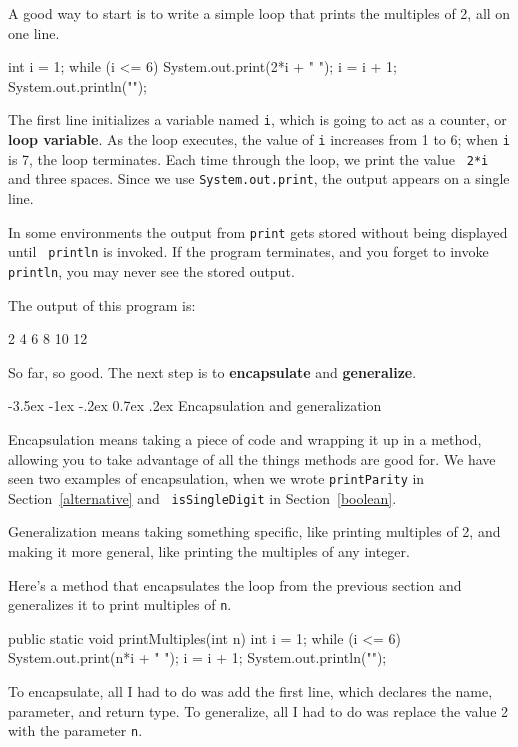 \documentclass{book}
\makeatletter
\renewcommand{\section}{\@startsection 
    {section} {1} {0mm}%
    {-3.5ex \@plus -1ex \@minus -.2ex}%
    {0.7ex \@plus.2ex}%
    {\normalfont\Large\bfseries}}
\makeatother
\begin{document}
A good way to start is to write a simple loop that prints
the multiples of 2, all on one line.

\begin{verbatimtab}
    int i = 1;
    while (i <= 6) {
      System.out.print(2*i + "   ");
      i = i + 1;
    }
    System.out.println("");
\end{verbatimtab}
%
The first line initializes a variable named {\tt i}, which is going
to act as a counter, or {\bf loop variable}.  As the loop executes,
the value of {\tt i} increases from 1 to 6; when {\tt i} is 7, the
loop terminates.  Each time through the loop, we print the value {\tt
  2*i} and three spaces.  Since we use {\tt System.out.print}, 
the output appears on a single line.


In some environments the
output from {\tt print} gets stored without being displayed until {\tt
println} is invoked.  If the program terminates, and you forget to
invoke {\tt println}, you may never see the stored output.

The output of this program is:

\begin{verbatimtab}
2   4   6   8   10   12
\end{verbatimtab}
%
So far, so good.  The next step is to {\bf encapsulate} and {\bf
generalize}.


\section {Encapsulation and generalization}
\label{encapsulation}

Encapsulation means taking a piece of code and wrapping it up
in a method, allowing you to take advantage of all the things methods
are good for.  We have seen two examples of encapsulation, when we
wrote {\tt printParity} in Section~\ref{alternative} and {\tt
isSingleDigit} in Section~\ref{boolean}.

Generalization means taking something specific, like printing
multiples of 2, and making it more general, like printing the
multiples of any integer.


Here's a method that encapsulates the loop from the previous
section and generalizes it to print multiples of {\tt n}.

\begin{verbatimtab}
  public static void printMultiples(int n) {
    int i = 1;
    while (i <= 6) {
      System.out.print(n*i + "   ");
      i = i + 1;
    }    
    System.out.println("");
  }
\end{verbatimtab}
%
To encapsulate, all I had to do was add the first line,
which declares the name, parameter,
and return type.  To generalize, all I had to do was replace
the value 2 with the parameter {\tt n}.
\end{document}
